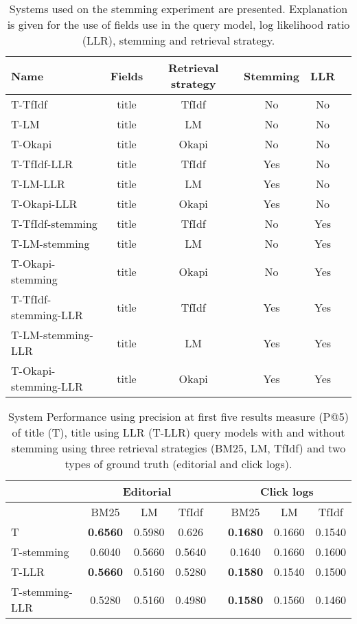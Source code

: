 \begin{table}[H]
\begin{center}
\scriptsize
\caption{Systems used on the stemming experiment are presented. Explanation is given for the use of fields use in the query model, log likelihood ratio (LLR), stemming and retrieval strategy.}
\begin{tabular}{lccccr}
\midrule
Name & Fields & Retrieval strategy & Stemming & LLR \\
\midrule
T-TfIdf & title & TfIdf & No & No \\
T-LM & title & LM & No & No \\
T-Okapi & title & Okapi & No & No \\
T-TfIdf-LLR & title & TfIdf & Yes & No \\
T-LM-LLR & title & LM & Yes & No \\
T-Okapi-LLR & title & Okapi & Yes & No \\
T-TfIdf-stemming & title & TfIdf & No & Yes \\
T-LM-stemming & title & LM & No & Yes \\
T-Okapi-stemming & title & Okapi & No & Yes \\
T-TfIdf-stemming-LLR & title & TfIdf & Yes & Yes \\
T-LM-stemming-LLR & title & LM & Yes & Yes \\
T-Okapi-stemming-LLR & title & Okapi & Yes & Yes \\
\bottomrule
\end{tabular}
\end{center}
\end{table}


\begin{table}[h]
\begin{center}
\caption{System Performance using precision at first five results measure (P@5) of title (T), title using LLR (T-LLR) query models with and without stemming using three retrieval strategies (BM25, LM, TfIdf) and two types of ground truth (editorial and click logs).}
\begin{tabular}{lccccccc}
\toprule
 & \multicolumn{3}{c}{Editorial} & & \multicolumn{3}{c}{Click logs} \\
\midrule
 & BM25 & LM & TfIdf &   & BM25 & LM & TfIdf \\
\midrule
T &  \textbf{0.6560} &  0.5980 & 0.626 &   &            \textbf{0.1680} & 0.1660 & 0.1540 \\
T-stemming 	& 0.6040 & 0.5660 & 0.5640 &   &	 		0.1640 & 0.1660 & 0.1600 \\
T-LLR & \textbf{0.5660} & 0.5160 & 0.5280 &   &	 		\textbf{0.1580} & 0.1540 & 0.1500 \\
T-stemming-LLR & 0.5280 & 0.5160 & 0.4980 &   &	 		\textbf{0.1580} & 0.1560 & 0.1460 \\
\bottomrule
\end{tabular}
\end{center}
\end{table}




